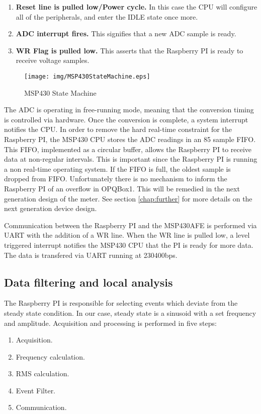 \begin{enumerate}
\item \textbf{Reset line is pulled low/Power cycle.} In this case the CPU will configure all of the peripherals, and enter the IDLE state once more.
\item \textbf{ADC interrupt fires.} This signifies that a new ADC sample is ready.
\item \textbf{WR Flag is pulled low.} This asserts that the Raspberry PI is ready to receive voltage samples.
\end{enumerate}

\begin{figure}[h!]
\centering
\texttt{[image: img/MSP430StateMachine.eps]}
\caption{MSP430 State Machine}
\end{figure}

The ADC is operating in free-running mode, meaning that the conversion timing is controlled via hardware. Once the conversion is complete, a system interrupt notifies the CPU. In order to remove the hard real-time constraint for the Raspberry PI, the MSP430 CPU stores the ADC readings in an 85 sample FIFO. This FIFO, implemented as a circular buffer,  allows the Raspberry PI to receive data at non-regular intervals. This is important since the Raspberry PI is running a non real-time operating system. If the FIFO is full, the oldest sample is dropped from FIFO. Unfortunately there is no mechanism to inform the Raspberry PI of an overflow in OPQBox1. This will be remedied in the next generation design of the meter. See section \ref{chap:further} for more details on the next generation device design.

Communication between the Raspberry PI and the MSP430AFE is performed via UART with the addition of a WR line. When the WR line is pulled low, a level triggered interrupt notifies the MSP430 CPU that the PI is ready for more data. The data is transfered via UART running at 230400bps.

\subsection{Data filtering and local analysis}

The Raspberry PI is responsible for selecting events which deviate from the steady state condition. In our case, steady state is a sinusoid with a set frequency and amplitude. Acquisition and processing is performed in five steps:

\begin{enumerate}
\item Acquisition.
\item Frequency calculation.
\item RMS calculation.
\item Event Filter.
\item Communication.
\end{enumerate}

